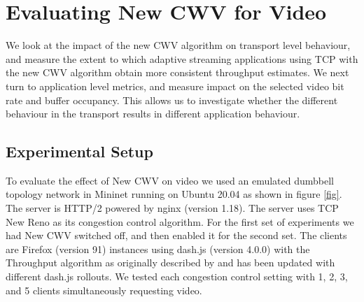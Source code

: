 \documentclass[10pt,sigconf]{acmart}
\begin{document}


\section{Evaluating New CWV for Video}

We look at the impact of the new CWV algorithm on transport level behaviour, and measure the extent to which adaptive streaming applications using TCP with the new CWV algorithm obtain more consistent throughput estimates. We next turn to application level metrics, and measure impact on the selected video bit rate and buffer occupancy. This allows us to investigate whether the different behaviour in the transport results in different application behaviour. 

\subsection{Experimental Setup}
\label{sec:experimental-setup}

To evaluate the effect of New CWV on video we used an emulated dumbbell topology network in Mininet running on Ubuntu 20.04 as shown in figure \ref{fig}.
 The server is HTTP/2 powered by nginx (version 1.18). The server uses TCP New Reno as its congestion control algorithm. For the first set of experiments we had New CWV switched off, and then enabled it for the second set.
 The clients are Firefox (version 91) instances using dash.js (version 4.0.0) with the Throughput algorithm as originally described by \cite{Spiteri-2019-from-theory-to-practice-sabre} and has been updated with different dash.js rollouts. We tested each congestion control setting with 1, 2, 3, and 5 clients simultaneously requesting video.
 
\end{document}

